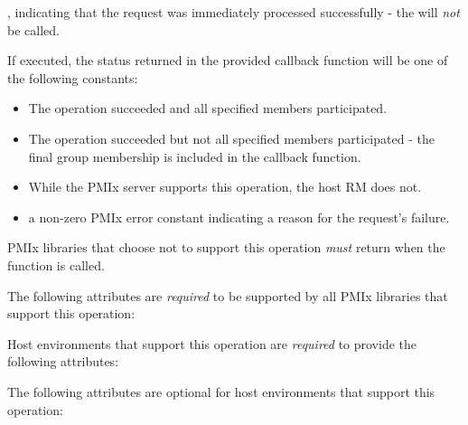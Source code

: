 \returnsimplenb

\returnstart
\begin{constantdesc}
\item {}, indicating that the request was immediately processed successfully - the  will \textit{not} be called.
\end{constantdesc}
\returnend

If executed, the status returned in the provided callback function will be one of the following constants:

\begin{itemize}
\item {} The operation succeeded and all specified members participated.
\item {} The operation succeeded but not all specified members participated - the final group membership is included in the callback function.
\item {} While the \ac{PMIx} server supports this operation, the host \ac{RM} does not.
\item a non-zero \ac{PMIx} error constant indicating a reason for the request's failure.
\end{itemize}

\reqattrstart
\ac{PMIx} libraries that choose not to support this operation \textit{must} return  when the function is called.

The following attributes are \textit{required} to be supported by all \ac{PMIx} libraries that support this operation:


Host environments that support this operation are \textit{required} to provide the following attributes:


\reqattrend

\optattrstart
The following attributes are optional for host environments that support this operation:


\optattrend

\descr

